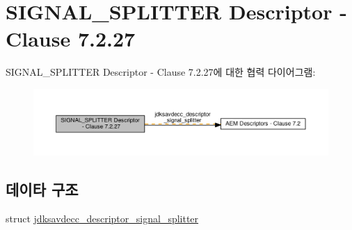 \hypertarget{group__descriptor__signal__splitter}{}\section{S\+I\+G\+N\+A\+L\+\_\+\+S\+P\+L\+I\+T\+T\+ER Descriptor -\/ Clause 7.2.27}
\label{group__descriptor__signal__splitter}
S\+I\+G\+N\+A\+L\+\_\+\+S\+P\+L\+I\+T\+T\+ER Descriptor -\/ Clause 7.2.27에 대한 협력 다이어그램\+:
\nopagebreak
\begin{figure}[H]
\begin{center}
\leavevmode
\includegraphics[width=350pt]{group__descriptor__signal__splitter}
\end{center}
\end{figure}
\subsection*{데이타 구조}
\begin{DoxyCompactItemize}
\item 
struct \hyperlink{structjdksavdecc__descriptor__signal__splitter}{jdksavdecc\+\_\+descriptor\+\_\+signal\+\_\+splitter}
\end{DoxyCompactItemize}

